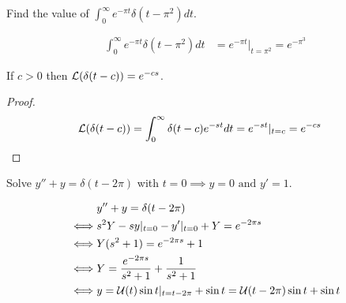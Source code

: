 \documentclass[notes]{subfiles}
\begin{document}
\begin{exercise}
    Find the value of $\int_0^\infty e^{-\pi t}\delta(t - \pi^2)dt$.
\end{exercise}
\begin{solution}
    \begin{align*}
        \int_0^\infty e^{-\pi t}\delta(t - \pi^2)dt
        &= e^{-\pi t}|_{t = \pi^2}
        = e^{-\pi^3}
    \end{align*}
\end{solution}

\begin{corollary}
    If $c > 0$ then $\mathcal{L}(\delta(t - c)) = e^{-cs}$.
\end{corollary}
\begin{proof}
    \begin{align*}
        \mathcal{L}(\delta(t - c))
        &= \int_0^\infty \delta(t - c)e^{-st}dt
        = e^{-st}|_{t = c}
        = e^{-cs}
    \end{align*}
\end{proof}

\begin{exercise}
    Solve $y'' + y = \delta(t - 2\pi)$ with $t = 0 \implies y = 0 \text{ and } y' = 1$.
\end{exercise}
\begin{solution}
    \begin{align*}
        &y'' + y = \delta(t - 2\pi) \\
        \iff& s^2 Y - sy|_{t = 0} - y'|_{t = 0} + Y = e^{-2\pi s} \\
        \iff& Y(s^2 + 1) = e^{-2\pi s} + 1 \\
        \iff& Y = \frac{e^{-2\pi s}}{s^2 + 1} + \frac{1}{s^2 + 1} \\
        \iff& y = \mathcal{U}(t)\sin t|_{t = t - 2\pi} + \sin t = \mathcal{U}(t - 2\pi)\sin t + \sin t
    \end{align*}
\end{solution}

\end{document}

